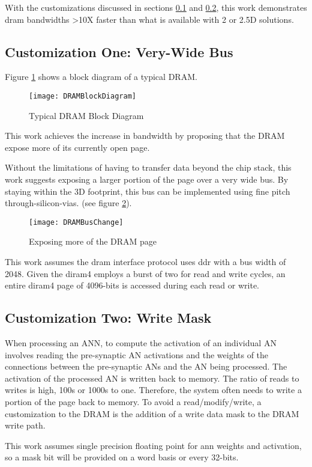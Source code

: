 With the customizations discussed in sections \ref{sec:Very-Wide Bus} and \ref{sec:Write Mask}, this work demonstrates \ac{dram} bandwidths >10X faster than what is available with 2 or 2.5D solutions.

\subsection{Customization One: Very-Wide Bus}
\label{sec:Very-Wide Bus}

Figure \ref{fig:dramBlockDiagram} shows a block diagram of a typical DRAM.

\begin{figure}[!t]
\centering
\captionsetup{justification=centering}
\centerline{
\mbox{\texttt{[image: DRAMBlockDiagram]}}
}
\caption{Typical DRAM Block Diagram}
\label{fig:dramBlockDiagram}
\end{figure}

This work achieves the increase in bandwidth by proposing that the DRAM expose more of its currently open page.

Without the limitations of having to transfer data beyond the chip stack, this work suggests exposing a larger portion of the page over a very wide bus. By staying within the 3D footprint, this bus can be implemented using fine pitch through-silicon-vias.
(see figure \ref{fig:dramBusChange}).

\begin{figure}[!t]
\centering
\captionsetup{justification=centering}
\captionsetup{width=.75\linewidth}
\centerline{
\mbox{\texttt{[image: DRAMBusChange]}}
}
\caption{Exposing more of the DRAM page}
\label{fig:dramBusChange}
\end{figure}

This work assumes the \ac{dram} interface protocol uses \ac{ddr} with a bus width of 2048. Given the \ac{diram4} employs a burst of two for read and write cycles, an entire \ac{diram4} page of 4096-bits is accessed during each read or write. 

\subsection{Customization Two: Write Mask}
\label{sec:Write Mask}
When processing an ANN, to compute the activation of an individual AN involves reading the pre-synaptic AN activations and the weights of the connections between the pre-synaptic ANs and the AN being processed. The activation of the processed AN is written back to memory. The ratio of reads to writes is high, 100s or 1000s to one. Therefore, the system often needs to write a portion of the page back to memory. To avoid a read/modify/write, a customization to the DRAM is the addition of a write data mask to the DRAM write path.

This work assumes single precision floating point for \ac{ann} weights and activation, so a mask bit will be provided on a word basis or every 32-bits.

